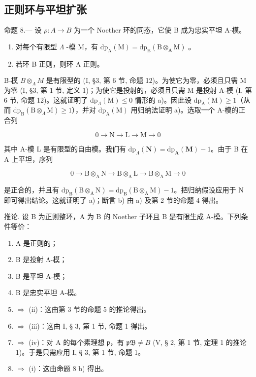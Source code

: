 \subsection{正则环与平坦扩张}

命题 8.--- 设 \(\rho: A \to B\) 为一个 Noether 环的同态，它使 B 成为忠实平坦 A-模。

\begin{enumerate}
\def\labelenumi{\alph{enumi})}
\item
  对每个有限型 \(\Lambda\) -模 M，有 \(\mathrm{dp}_{\mathrm{A}}(\mathrm{M}) = \mathrm{dp}_{\mathrm{B}}(\mathrm{B} \otimes_{\mathrm{A}} \mathrm{M})\) 。
\item
  若环 B 正则，则环 A 正则。
\end{enumerate}

B-模 \(B \otimes_{A} M\) 是有限型的 (I, §3, 第 6 节, 命题 12)。为使它为零，必须且只需 M 为零 (I, §3, 第 1 节, 定义 1)；为使它是投射的，必须且只需 M 是投射 A-模 (I, 第 6 节, 命题 12)。这就证明了 \(\mathrm{dp}_{\Lambda}(\mathrm{M}) \leqslant 0\) 情形的 a)。因此设 \(\mathrm{dp}_{\mathrm{A}}(\mathrm{M}) \geqslant 1\)（从而 \(\mathrm{dp}_{\mathrm{B}}(\mathrm{B} \otimes_{\Lambda} \mathrm{M}) \geqslant 1\)），并对 \(\mathrm{dp}_{\mathrm{A}}(\mathrm{M})\) 用归纳法证明 a)。选取一个 A-模的正合列

\[
0 \to \mathrm{N} \to \mathrm{L} \to \mathrm{M} \to 0
\]

其中 A-模 L 是有限型的自由模。我们有 \(\mathrm{dp}_{\Lambda}(\mathbf{N}) = \mathrm{dp}_{\mathbf{A}}(\mathbf{M}) - 1\)。由于 B 在 A 上平坦，序列

\[
0 \rightarrow \mathrm{B} \otimes_ {\mathrm{A}} \mathrm{N} \rightarrow \mathrm{B} \otimes_ {\mathrm{A}} \mathrm{L} \rightarrow \mathrm{B} \otimes_ {\mathrm{A}} \mathrm{M} \rightarrow 0
\]

是正合的，并且有 \(\mathrm{dp}_{\mathrm{B}}(\mathrm{B}\otimes_{\mathrm{A}}\mathrm{N}) = \mathrm{dp}_{\mathrm{B}}(\mathrm{B}\otimes_{\mathrm{A}}\mathrm{M}) - 1\)。把归纳假设应用于 N 即可得出结论。这就证明了 a)；断言 b) 由 a) 及第 2 节的命题 4 得出。

推论. 设 B 为正则整环，A 为 B 的 Noether 子环且 B 是有限生成 A-模。下列条件等价：

\begin{enumerate}
\def\labelenumi{(\roman{enumi})}
\item
  A 是正则的；
\item
  B 是投射 Λ-模；
\item
  B 是平坦 A-模；
\item
  B 是忠实平坦 A-模。
\item
  \(\Rightarrow\) (ii)：这由第 3 节的命题 5 的推论得出。
\item
  \(\Rightarrow\) (iii)：这由 I, § 3, 第 1 节, 命题 1 得出。
\item
  \(\Rightarrow\) (iv)：对 A 的每个素理想 \(\mathfrak{p}\)，有 \(\mathfrak{pB} \neq B\) (V, § 2, 第 1 节, 定理 1 的推论 1)。于是只需应用 I, § 3, 第 1 节, 命题 1。
\item
  \(\Rightarrow\) (i)：这由命题 8 b) 得出。
\end{enumerate}

